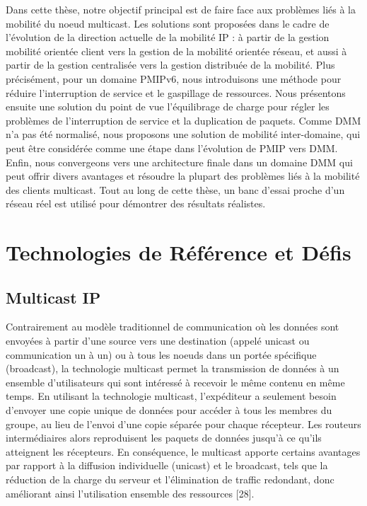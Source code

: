 Dans cette thèse, notre objectif principal est de faire face aux problèmes liés à la mobilité du noeud multicast. Les solutions sont proposées dans le cadre de l'évolution de la direction actuelle de la mobilité IP : à partir de la gestion mobilité orientée client vers la gestion de la mobilité orientée réseau, et aussi à partir de la gestion centralisée vers la gestion distribuée de la mobilité. Plus précisément, pour un domaine PMIPv6, nous introduisons une méthode pour réduire l'interruption de service et le gaspillage de ressources. Nous présentons ensuite une solution du point de vue l'équilibrage de charge pour régler les problèmes de l'interruption de service et la duplication de paquets. Comme DMM n'a pas été normalisé, nous proposons une solution de mobilité inter-domaine, qui peut être considérée comme une étape dans l'évolution de PMIP vers DMM. Enfin, nous convergeons vers une architecture finale dans un domaine DMM qui peut offrir divers avantages et résoudre la plupart des problèmes liés à la mobilité des clients multicast. Tout au long de cette thèse, un banc d'essai proche d’un réseau réel est utilisé pour démontrer des résultats réalistes.

\section{Technologies de Référence et Défis}
\subsection{Multicast IP}
Contrairement au modèle traditionnel de communication où les données sont envoyées à partir d'une source vers une destination (appelé unicast ou communication un à un) ou à tous les noeuds dans un portée spécifique (broadcast), la technologie multicast permet la transmission de données à un ensemble d'utilisateurs qui sont intéressé à recevoir le même contenu en même temps. En utilisant la technologie multicast, l'expéditeur a seulement besoin d'envoyer une copie unique de données pour accéder à tous les membres du groupe, au lieu de l'envoi d'une copie séparée pour chaque récepteur. Les routeurs intermédiaires alors reproduisent les paquets de données jusqu'à ce qu'ils atteignent les récepteurs. En conséquence, le multicast apporte certains avantages par rapport à la diffusion individuelle (unicast) et le broadcast, tels que la réduction de la charge du serveur et  l'élimination de traffic redondant, donc améliorant ainsi l'utilisation ensemble des ressources [28].

